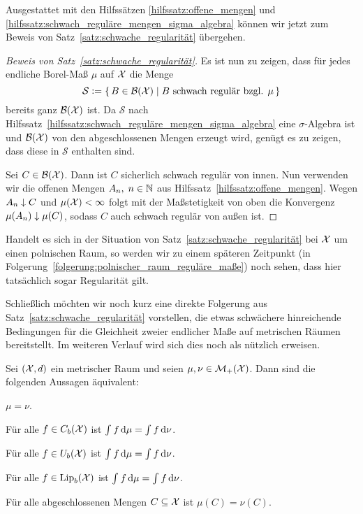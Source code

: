 \documentclass[../main/main.tex]{subfiles}
\begin{document}
	Ausgestattet mit den Hilfssätzen \ref{hilfssatz:offene_mengen} und \ref{hilfssatz:schwach_reguläre_mengen_sigma_algebra} können wir jetzt zum Beweis von Satz~\ref{satz:schwache_regularität} 
	übergehen.
	
	\begin{proof}[Beweis von Satz~\ref{satz:schwache_regularität}]
		Es ist nun zu zeigen, dass für jedes endliche Borel-Maß $\mu$ auf $\mathcal{X}$
		die Menge 
		$$\mathcal{S} \vcentcolon = \left\{\, B \in \mathcal{B}(\mathcal{X}) \; \middle| \; B \text{ schwach regulär bzgl. } \mu \,\right\}$$
		bereits ganz $\mathcal{B}(\mathcal{X})$ ist. 
		Da $\mathcal{S}$ nach Hilfssatz~\ref{hilfssatz:schwach_reguläre_mengen_sigma_algebra} eine 
		$\sigma$-Algebra ist und 
		$\mathcal{B}(\mathcal{X})$ von den abgeschlossenen Mengen erzeugt wird, genügt es zu zeigen, 
		dass diese in $\mathcal{S}$ enthalten sind. 
		
		Sei $C \in \mathcal{B}(\mathcal{X})$. Dann ist $C$ sicherlich schwach regulär von innen. 
		Nun verwenden wir die offenen Mengen $A_n, \; n \in \mathbb{N}$ aus 
		Hilfssatz~\ref{hilfssatz:offene_mengen}. 
		Wegen $A_n \downarrow C$ und $\mu(\mathcal{X}) < \infty$ folgt mit der 
		Maßstetigkeit von oben die Konvergenz $\mu(A_n) \downarrow \mu(C)$,
		sodass $C$ auch schwach regulär von außen ist.
	\end{proof}

	\begin{Bemerkung}
		Handelt es sich in der Situation von Satz~\ref{satz:schwache_regularität} bei $\mathcal{X}$ um einen polnischen Raum, 
		so werden wir zu einem späteren Zeitpunkt (in Folgerung~\ref{folgerung:polnischer_raum_reguläre_maße}) noch sehen, dass hier tatsächlich sogar Regularität gilt.
	\end{Bemerkung}
	
	Schließlich möchten wir noch kurz eine direkte Folgerung aus Satz~\ref{satz:schwache_regularität} vorstellen, die etwas 
	schwächere hinreichende Bedingungen für die Gleichheit 
	zweier endlicher Maße auf metrischen Räumen bereitstellt. Im weiteren Verlauf 
	wird sich dies noch als nützlich erweisen.
	
	\begin{Folgerung}
		\label{folgerung:gleichheit_von_maßen}
		Sei $(\mathcal{X},d)$ ein metrischer Raum und seien $\mu, \nu \in \mathcal{M}_{+}(\mathcal{X})$. 
		Dann sind die folgenden Aussagen äquivalent:
		\begin{equivalentthm}
			\item $\mu = \nu$.
			\item Für alle $f \in C_b(\mathcal{X})$ ist
			$\int_{} \, f \, \mathrm{d}\mu = \int_{} \, f \, \mathrm{d}\nu$.
			\item Für alle $f \in U_b(\mathcal{X})$ ist
			$\int_{} \, f \, \mathrm{d}\mu = \int_{} \, f \, \mathrm{d}\nu$.
			\item Für alle $f \in \mathrm{Lip}_b(\mathcal{X})$ ist
			$\int_{} \, f \, \mathrm{d}\mu = \int_{} \, f \, \mathrm{d}\nu$.
			\item Für alle abgeschlossenen Mengen $C \subseteq \mathcal{X}$ ist $\mu(C) = \nu(C)$.
		\end{equivalentthm}
	\end{Folgerung}
	
\end{document}
